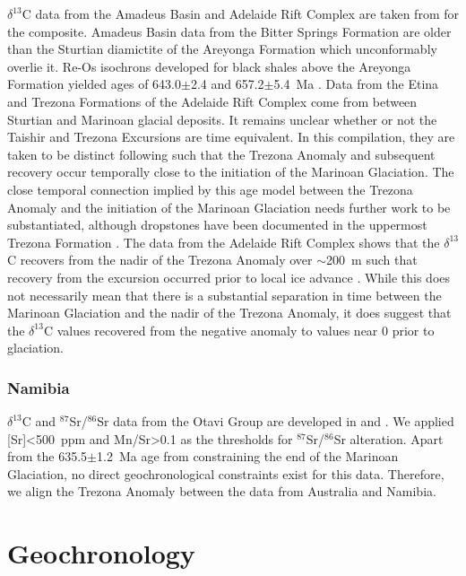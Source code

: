 \documentclass[11pt,letterpaper]{article}
\newcommand{\dC}{$\delta^{13}$C\xspace}
\newcommand{\SrSr}{$^{87}$Sr/$^{86}$Sr\xspace}
\newcommand{\permil}{\textperthousand\xspace}
\begin{document}
\dC data from the Amadeus Basin and Adelaide Rift Complex are taken from \citet{Swanson-Hysell2010a} for the composite. Amadeus Basin data from the Bitter Springs Formation are older than the Sturtian diamictite of the Areyonga Formation which unconformably overlie it. Re-Os isochrons developed for black shales above the Areyonga Formation yielded ages of 643.0$\pm$2.4 and 657.2$\pm$5.4~Ma \citep{Kendall2006a}. Data from the Etina and Trezona Formations of the Adelaide Rift Complex come from between Sturtian and Marinoan glacial deposits. It remains unclear whether or not the Taishir and Trezona Excursions are time equivalent. In this compilation, they are taken to be distinct following \citet{Bold2016a} such that the Trezona Anomaly and subsequent recovery occur temporally close to the initiation of the Marinoan Glaciation. The close temporal connection implied by this age model between the Trezona Anomaly and the initiation of the Marinoan Glaciation needs further work to be substantiated, although dropstones have been documented in the uppermost Trezona Formation \citep{Rose2012a}. The data from the Adelaide Rift Complex shows that the \dC recovers from the nadir of the Trezona Anomaly over $\sim$200~m such that recovery from the excursion occurred prior to local ice advance \citep{Rose2012a}. While this does not necessarily mean that there is a substantial separation in time between the Marinoan Glaciation and the nadir of the Trezona Anomaly, it does suggest that the \dC values recovered from the negative anomaly to values near 0\permil prior to glaciation.

\subsubsection*{Namibia}

\dC and \SrSr data from the Otavi Group are developed in \citet{Halverson2005a} and \citet{Halverson2007b}. We applied [Sr]\textless500~ppm and Mn/Sr\textgreater0.1 as the thresholds for \SrSr alteration. Apart from the 635.5$\pm$1.2~Ma age from \citet{Hoffmann2004a} constraining the end of the Marinoan Glaciation, no direct geochronological constraints exist for this data. Therefore, we align the Trezona Anomaly between the data from Australia and Namibia.

\clearpage

\section*{Geochronology}
\end{document}
